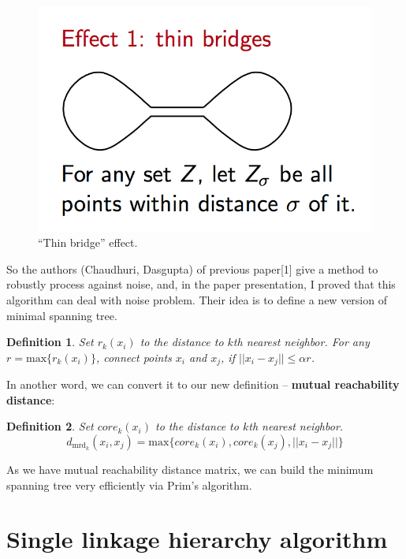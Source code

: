 \documentclass{article}
\newtheorem{definition}{Definition}
\begin{document}
\begin{figure}[h!]
	\centering
	\includegraphics[scale=0.35]{a.png}
	\caption{``Thin bridge'' effect.}
	\label{fig:slabfig}
\end{figure}

So the authors (Chaudhuri, Dasgupta) of previous paper[1] give a method to robustly process against noise, and, in the paper presentation, I proved that this algorithm can deal with noise problem. Their idea is to define a new version of minimal spanning tree.

\begin{tcolorbox}
\begin{definition}
Set $r_k(x_i)$ to the distance to $k$th nearest neighbor. For any $r = \text{max}\{r_k(x_i)\}$, connect points $x_i$ and $x_j$, if $||x_i - x_j|| \leq \alpha r$.
\end{definition}
\end{tcolorbox}

In another word, we can convert it to our new definition -- \textbf{mutual reachability distance}:

\begin{tcolorbox}
	\begin{definition}
		Set $core_k(x_i)$ to the distance to $k$th nearest neighbor.
		$$d_{\mathrm{mrd}_k}(x_i, x_j) = \text{max}\{core_k(x_i), core_k(x_j), ||x_i - x_j||\}$$
	\end{definition}
\end{tcolorbox}

As we have mutual reachability distance matrix, we can build the minimum spanning tree very efficiently via Prim's algorithm.

\section{Single linkage hierarchy algorithm}
\end{document}

